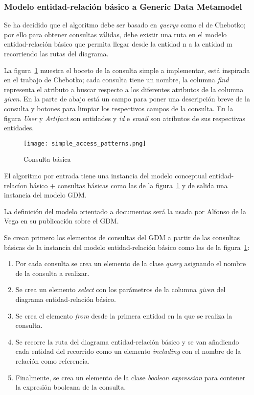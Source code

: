 \subsubsection{Modelo entidad-relación básico a Generic Data Metamodel}

Se ha decidido que el algoritmo debe ser basado en \textit{querys} como el de Chebotko; por ello para obtener consultas válidas, debe existir una ruta en el modelo entidad-relación básico que permita llegar desde la entidad n a la entidad m recorriendo las rutas del diagrama.


La figura~\ref{img:simple-access-pattern} muestra el boceto de la consulta simple a implementar, está inspirada en el trabajo de Chebotko; cada consulta tiene un nombre, la columna \textit{find} representa el atributo a buscar respecto a los diferentes atributos de la columna \textit{given}. En la parte de abajo está un campo para poner una descripción breve de la consulta y botones para limpiar los respectivos campos de la consulta. En la figura \textit{User} y \textit{Artifact} son entidades y \textit{id} e \textit{email} son atributos de sus respectivas entidades.


\begin{figure}[H] 
    \centering
    \texttt{[image: simple\_access\_patterns.png]}
    \caption{Consulta básica}
    \label{img:simple-access-pattern}
\end{figure}


El algoritmo por entrada tiene una instancia del modelo conceptual entidad-relacíon básico $+$ consultas básicas como las de la figura~\ref{img:simple-access-pattern} y de salida una instancia del modelo GDM.


La definición del modelo orientado a documentos será la usada por Alfonso de la Vega en su publicación sobre el GDM.


Se crean primero los elementos de consultas del GDM a partir de las consultas básicas de la instancia del modelo entidad-relación básico como las de la figura~\ref{img:simple-access-pattern}:


\begin{enumerate}
    \item Por cada consulta se crea un elemento de la clase \textit{query} asignando el nombre de la consulta a realizar.
    \item Se crea un elemento \textit{select} con los parámetros de la columna \textit{given} del diagrama entidad-relación básico.
    \item Se crea el elemento \textit{from} desde la primera entidad en la que se realiza la consulta.
    \item Se recorre la ruta del diagrama entidad-relación básico y se van añadiendo cada entidad del recorrido como un elemento \textit{including} con el nombre de la relación como referencia.
    \item Finalmente, se crea un elemento de la clase \textit{boolean expression} para contener la expresión booleana de la consulta.
\end{enumerate}


